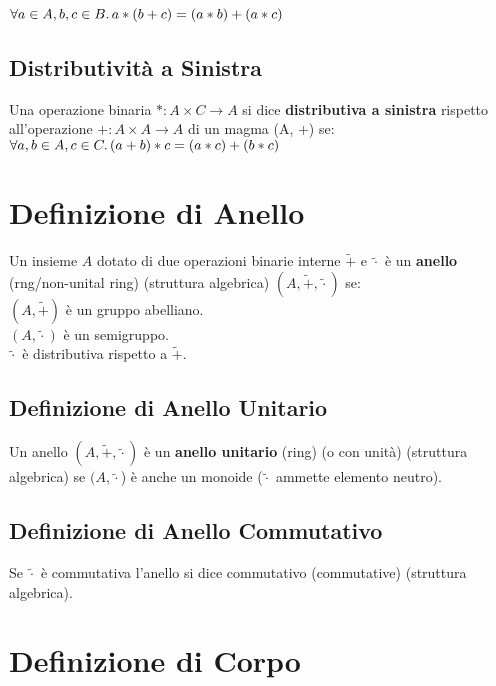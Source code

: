 \documentclass[a4paper, twoside, italian, 11pt]{book}
\begin{document}
$\forall a \in A, b, c \in B \ldotp a * (b + c) = (a * b) + (a * c)$


\subsection{Distributività a Sinistra}

Una operazione binaria $* : A \times C \rightarrow A$ si dice \textbf{distributiva a sinistra} rispetto all'operazione $+ : A \times A \rightarrow A$ di un magma (A, +) se: \\

$\forall a, b \in A, c \in C \ldotp (a + b) * c = (a * c) + (b * c)$



\section{Definizione di Anello}

Un insieme $A$ dotato di due operazioni binarie interne $\tilde{+}$ e $\tilde{\cdot}$ è un \textbf{anello} (rng/non-unital ring) (struttura algebrica) $(A, \tilde{+}, \tilde{\cdot})$ se: \\

$(A, \tilde{+})$ è un gruppo abelliano. \\
\indent
$(A, \tilde{\cdot})$ è un semigruppo. \\
\indent
$\tilde{\cdot}$ è distributiva rispetto a $\tilde{+}$.


\subsection{Definizione di Anello Unitario}

Un anello $(A, \tilde{+}, \tilde{\cdot})$ è un \textbf{anello unitario} (ring) (o con unità) (struttura algebrica) se $(A, \tilde{\cdot}$) è anche un monoide ($\tilde{\cdot}$ ammette elemento neutro).


\subsection{Definizione di Anello Commutativo}

Se $\tilde{\cdot}$ è commutativa l'anello si dice commutativo (commutative) (struttura algebrica).



\section{Definizione di Corpo}
\end{document}
